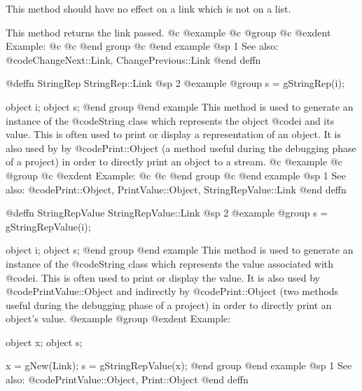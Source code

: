 This method should have no effect on a link which is not on a list.

This method returns the link passed.
@c @example
@c @group
@c @exdent Example:
@c 
@c @end group
@c @end example
@sp 1
See also:  @code{ChangeNext::Link, ChangePrevious::Link}
@end deffn








@deffn {StringRep} StringRep::Link
@sp 2
@example
@group
s = gStringRep(i);

object  i;
object  s;
@end group
@end example
This method is used to generate an instance of the @code{String} class
which represents the object @code{i} and its value.  This is often used
to print or display a representation of an object.  It is also used by
by @code{Print::Object} (a method useful during the debugging phase of
a project) in order to directly print an object to a stream.
@c @example
@c @group
@c @exdent Example:
@c 
@c @end group
@c @end example
@sp 1
See also:  @code{Print::Object, PrintValue::Object, StringRepValue::Link}
@end deffn











@deffn {StringRepValue} StringRepValue::Link
@sp 2
@example
@group
s = gStringRepValue(i);

object  i;
object  s;
@end group
@end example
This method is used to generate an instance of the @code{String} class
which represents the value associated with @code{i}.  This is often
used to print or display the value.  It is also used by
@code{PrintValue::Object} and indirectly by @code{Print::Object}
(two methods useful during the debugging phase of a project)
in order to directly print an object's value.
@example
@group
@exdent Example:

object  x;
object  s;

x = gNew(Link);
s = gStringRepValue(x);
@end group
@end example
@sp 1
See also:  @code{PrintValue::Object, Print::Object}
@end deffn












